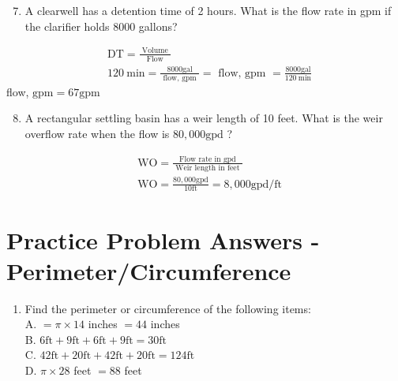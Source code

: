 \documentclass[10pt]{article}
\begin{document}
\begin{enumerate}
  \setcounter{enumi}{6}
  \item A clearwell has a detention time of 2 hours. What is the flow rate in gpm if the clarifier holds 8000 gallons?
\end{enumerate}
$$
\begin{aligned}
&\mathrm{DT}=\frac{\text { Volume }}{\text { Flow }} \\
&120 \mathrm{~min}=\frac{8000 \mathrm{gal}}{\text { flow, gpm }}=\text { flow, gpm }=\frac{8000 \mathrm{gal}}{120 \mathrm{~min}}
\end{aligned}
$$
flow, $\mathrm{gpm}=67 \mathrm{gpm}$

\begin{enumerate}
  \setcounter{enumi}{7}
  \item A rectangular settling basin has a weir length of 10 feet. What is the weir overflow rate when the flow is $80,000 \mathrm{gpd}$ ?
\end{enumerate}
$$
\begin{aligned}
&\mathrm{WO}=\frac{\text { Flow rate in gpd }}{\text { Weir length in feet }} \\
&\mathrm{WO}=\frac{80,000 \mathrm{gpd}}{10 \mathrm{ft}}=8,000 \mathrm{gpd} / \mathrm{ft}
\end{aligned}
$$

\section{Practice Problem Answers - Perimeter/Circumference}
\begin{enumerate}
  \item Find the perimeter or circumference of the following items:\\
A. $=\pi \times 14$ inches $=44$ inches\\
B. $6 \mathrm{ft}+9 \mathrm{ft}+6 \mathrm{ft}+9 \mathrm{ft}=30 \mathrm{ft}$\\
C. $42 \mathrm{ft}+20 \mathrm{ft}+42 \mathrm{ft}+20 \mathrm{ft}=124 \mathrm{ft}$\\
D. $\pi \times 28$ feet $=88$ feet
\end{enumerate}
\end{document}
